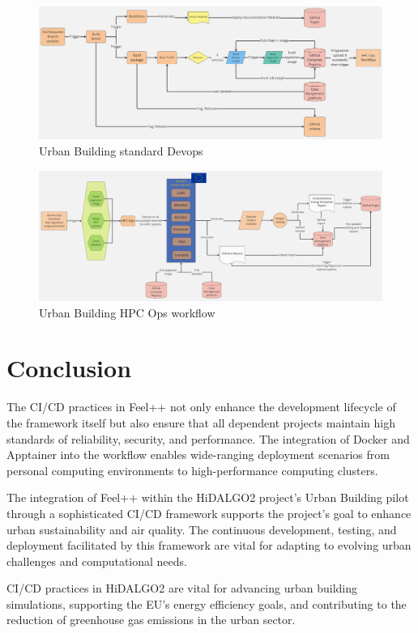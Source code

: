 \documentclass[runningheads]{llncs}
\begin{document}
\begin{figure}
    \centering
    \includegraphics[width=\textwidth]{images/ub-devops.pdf}
    \caption{Urban Building standard Devops}
    \label{fig:ub-devops}
\end{figure}

\begin{figure}
    \centering
    \includegraphics[width=\textwidth]{images/ub-hpcops.pdf}
    \caption{Urban Building HPC Ops workflow}
    \label{fig:ub-hpcops}
\end{figure}
\section{Conclusion}
The CI/CD practices in Feel++ not only enhance the development lifecycle of the framework itself but also ensure that all dependent projects maintain high standards of reliability, security, and performance. The integration of Docker and Apptainer into the workflow enables wide-ranging deployment scenarios from personal computing environments to high-performance computing clusters.

The integration of Feel++ within the HiDALGO2 project's Urban Building pilot through a sophisticated CI/CD framework supports the project's goal to enhance urban sustainability and air quality. The continuous development, testing, and deployment facilitated by this framework are vital for adapting to evolving urban challenges and computational needs.

CI/CD practices in HiDALGO2 are vital for advancing urban building simulations, supporting the EU's energy efficiency goals, and contributing to the reduction of greenhouse gas emissions in the urban sector.
\end{document}
